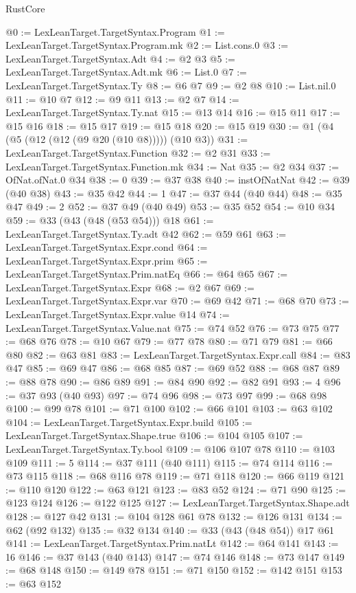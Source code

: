 \begin{lexlean}{RustCore}
\begin{coremodule}
@0 := LexLeanTarget.TargetSyntax.Program
@1 := LexLeanTarget.TargetSyntax.Program.mk
@2 := List.cons.{0}
@3 := LexLeanTarget.TargetSyntax.Adt
@4 := @2 @3
@5 := LexLeanTarget.TargetSyntax.Adt.mk
@6 := List.{0}
@7 := LexLeanTarget.TargetSyntax.Ty
@8 := @6 @7
@9 := @2 @8
@10 := List.nil.{0}
@11 := @10 @7
@12 := @9 @11
@13 := @2 @7
@14 := LexLeanTarget.TargetSyntax.Ty.nat
@15 := @13 @14
@16 := @15 @11
@17 := @15 @16
@18 := @15 @17
@19 := @15 @18
@20 := @15 @19
@30 := @1 (@4 (@5 (@12 (@12 (@9 @20 (@10 @8))))) (@10 @3))
@31 := LexLeanTarget.TargetSyntax.Function
@32 := @2 @31
@33 := LexLeanTarget.TargetSyntax.Function.mk
@34 := Nat
@35 := @2 @34
@37 := OfNat.ofNat.{0} @34
@38 := 0
@39 := @37 @38
@40 := instOfNatNat
@42 := @39 (@40 @38)
@43 := @35 @42
@44 := 1
@47 := @37 @44 (@40 @44)
@48 := @35 @47
@49 := 2
@52 := @37 @49 (@40 @49)
@53 := @35 @52
@54 := @10 @34
@59 := @33 (@43 (@48 (@53 @54))) @18
@61 := LexLeanTarget.TargetSyntax.Ty.adt @42
@62 := @59 @61
@63 := LexLeanTarget.TargetSyntax.Expr.cond
@64 := LexLeanTarget.TargetSyntax.Expr.prim
@65 := LexLeanTarget.TargetSyntax.Prim.natEq
@66 := @64 @65
@67 := LexLeanTarget.TargetSyntax.Expr
@68 := @2 @67
@69 := LexLeanTarget.TargetSyntax.Expr.var
@70 := @69 @42
@71 := @68 @70
@73 := LexLeanTarget.TargetSyntax.Expr.value @14
@74 := LexLeanTarget.TargetSyntax.Value.nat
@75 := @74 @52
@76 := @73 @75
@77 := @68 @76
@78 := @10 @67
@79 := @77 @78
@80 := @71 @79
@81 := @66 @80
@82 := @63 @81
@83 := LexLeanTarget.TargetSyntax.Expr.call
@84 := @83 @47
@85 := @69 @47
@86 := @68 @85
@87 := @69 @52
@88 := @68 @87
@89 := @88 @78
@90 := @86 @89
@91 := @84 @90
@92 := @82 @91
@93 := 4
@96 := @37 @93 (@40 @93)
@97 := @74 @96
@98 := @73 @97
@99 := @68 @98
@100 := @99 @78
@101 := @71 @100
@102 := @66 @101
@103 := @63 @102
@104 := LexLeanTarget.TargetSyntax.Expr.build
@105 := LexLeanTarget.TargetSyntax.Shape.true
@106 := @104 @105
@107 := LexLeanTarget.TargetSyntax.Ty.bool
@109 := @106 @107 @78
@110 := @103 @109
@111 := 5
@114 := @37 @111 (@40 @111)
@115 := @74 @114
@116 := @73 @115
@118 := @68 @116 @78
@119 := @71 @118
@120 := @66 @119
@121 := @110 @120
@122 := @63 @121
@123 := @83 @52
@124 := @71 @90
@125 := @123 @124
@126 := @122 @125
@127 := LexLeanTarget.TargetSyntax.Shape.adt
@128 := @127 @42
@131 := @104 @128 @61 @78
@132 := @126 @131
@134 := @62 (@92 @132)
@135 := @32 @134
@140 := @33 (@43 (@48 @54)) @17 @61
@141 := LexLeanTarget.TargetSyntax.Prim.natLt
@142 := @64 @141
@143 := 16
@146 := @37 @143 (@40 @143)
@147 := @74 @146
@148 := @73 @147
@149 := @68 @148
@150 := @149 @78
@151 := @71 @150
@152 := @142 @151
@153 := @63 @152

\end{coremodule}
\end{lexlean}
